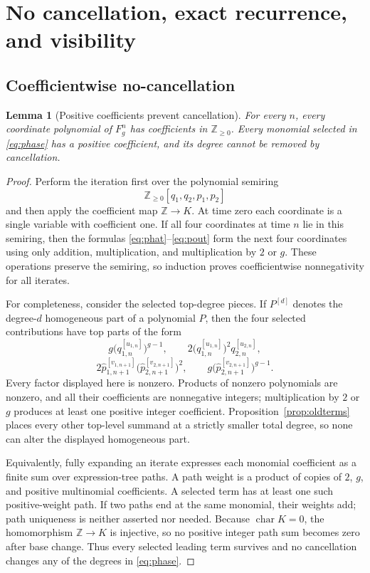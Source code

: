 \documentclass[11pt]{article}
\newtheorem{lemma}[theorem]{Lemma}
\theoremstyle{remark}
\numberwithin{equation}{section}
\begin{document}
\section{No cancellation, exact recurrence, and visibility}\label{sec:visibility}

\subsection{Coefficientwise no-cancellation}

\begin{lemma}[Positive coefficients prevent cancellation]\label{lem:nocancel}
For every \(n\), every coordinate polynomial of \(F_g^n\) has coefficients in
\(\mathbb Z_{\geq0}\).  Every monomial selected in
\eqref{eq:phase} has a positive coefficient, and its degree cannot be removed
by cancellation.
\end{lemma}

\begin{proof}
Perform the iteration first over the polynomial semiring
\[
 \mathbb Z_{\geq0}[q_1,q_2,p_1,p_2]
\]
and then apply the coefficient map $\mathbb Z\to K$.  At time zero each
coordinate is a single variable with coefficient one.  If all four coordinates
at time $n$ lie in this semiring, then the formulas
\eqref{eq:phat}--\eqref{eq:pout} form the next four coordinates using only
addition, multiplication, and multiplication by $2$ or $g$.  These operations
preserve the semiring, so induction proves coefficientwise nonnegativity for
all iterates.

For completeness, consider the selected top-degree pieces.  If $P^{[d]}$
denotes the degree-$d$ homogeneous part of a polynomial $P$, then the four
selected contributions have top parts of the form
\[
 g\bigl(q_{1,n}^{[u_{1,n}]}\bigr)^{g-1},\qquad
 2\bigl(q_{1,n}^{[u_{1,n}]}\bigr)^2q_{2,n}^{[u_{2,n}]},
\]
\[
 2\widehat p_{1,n+1}^{[v_{1,n+1}]}
   \bigl(\widehat p_{2,n+1}^{[v_{2,n+1}]}\bigr)^2,
 \qquad
 g\bigl(\widehat p_{2,n+1}^{[v_{2,n+1}]}\bigr)^{g-1}.
\]
Every factor displayed here is nonzero.  Products of nonzero polynomials are
nonzero, and all their coefficients are nonnegative integers; multiplication
by $2$ or $g$ produces at least one positive integer coefficient.
Proposition~\ref{prop:oldterms} places every other top-level summand at a
strictly smaller total degree, so none can alter the displayed homogeneous
part.

Equivalently, fully expanding an iterate expresses each monomial coefficient
as a finite sum over expression-tree paths.  A path weight is a product of
copies of $2$, $g$, and positive multinomial coefficients.  A selected term
has at least one such positive-weight path.  If two paths end at the same
monomial, their weights add; path uniqueness is neither asserted nor needed.
Because $\operatorname{char}K=0$, the homomorphism $\mathbb Z\to K$ is
injective, so no positive integer path sum becomes zero after base change.
Thus every selected leading term survives and no cancellation changes any of
the degrees in \eqref{eq:phase}.
\end{proof}
\end{document}
